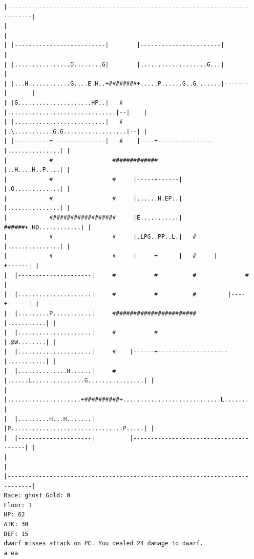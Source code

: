 \documentclass[11pt]{article}
\theoremstyle{plain}
\begin{document}
\begin{Verbatim}[fontsize=\scriptsize]
|-----------------------------------------------------------------------------|
|                                                                             |
| |--------------------------|        |-----------------------|               |
| |................D........G|        |...................G...|               |
| |...H............G....E.H..+########+.....P......G..G.......|-------|       |
| |G.....................HP..|   #    |...............................|--|    |
| |..........................|   #    |.\...........G.G..................|--| |
| |----------+---------------|   #    |----+----------------|...............| |
|            #                 #############                |..H....H..P....| |
|            #                 #     |-----+------|         |.O.............| |
|            #                 #     |......H.EP..|         |...............| |
|            ###################     |E...........|   ######+.HO............| |
|            #                 #     |.LPG..PP..L.|   #     |...............| |
|            #                 #     |-----+------|   #     |--------+------| |
|  |---------+-----------|     #           #          #              #        |
|  |.....................|     #           #          #         |----+------| |
|  |.........P...........|     ########################         |...........| |
|  |.....................|     #           #                    |.@W........| |
|  |.....................|     #    |------+--------------------|...........| |
|  |..............H......|     #    |......L...............G................| |
|  |.....................+##########+............................L..........| |
|  |.........H...H.......|          |P................................P.....| |
|  |---------------------|          |---------------------------------------| |
|                                                                             |
|-----------------------------------------------------------------------------|
Race: ghost Gold: 0                                                    Floor: 1
HP: 62
ATK: 30
DEF: 15
dwarf misses attack on PC. You dealed 24 damage to dwarf. 
a ea


\end{Verbatim}
\end{document}
